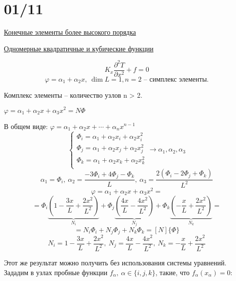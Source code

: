 \section*{01/11}
\begin{center}
\underline{Конечные элементы более высокого порядка}

\underline{Одномерные квадратичные и кубические функции}
\end{center}
\[
K_x \frac{\partial^2 T}{\partial x^2} + f = 0
\]
\[
\varphi = \alpha_1 + \alpha_2x, \ \dim L = 1, n = 2 \text{ -- симплекс элементы.}
\]

Комплекс элементы -- количество узлов n > 2.  

\begin{center}
\end{center}

$\varphi = \alpha_1 + \alpha_2x + \alpha_3x^2 = N \Phi$

В общем виде: $\varphi = \alpha_1 + \alpha_2x + \cdots + \alpha_nx^{n-1}$
\[
\begin{cases}
\Phi_i = \alpha_1 + \alpha_2x_i + \alpha_2x^{2}_i \\
\Phi_j = \alpha_1 + \alpha_2x_j + \alpha_2x^{2}_j \\
\Phi_k = \alpha_1 + \alpha_2x_k + \alpha_2x^{2}_k \\
\end{cases}
\rightarrow \alpha_1, \alpha_2, \alpha_3
\]
\[
\alpha_1 = \Phi_i, \ \alpha_2 = \frac{-3\Phi_i + 4\Phi_j -\Phi_k}{L}, \ \alpha_3 = \frac{2(\Phi_i-2\Phi_j+\Phi_k)}{L^2}
\]
\[
\varphi = \alpha_1 + \alpha_2x + \alpha_3x^2 = 
\]
\[
 = \Phi_i   \underbrace{\left(1 - \frac{3x}{L} + \frac{2x^2}{L^2} \right) }_{N_i}   + \Phi_j \underbrace{\left(\frac{4x}{L} - \frac{4x^2}{L^2} \right)}_{N_j} + \Phi_k \underbrace{\left(-\frac{x}{L} + \frac{2x^2}{L^2} \right)}_{N_k} = 
\]
\[
 = N_i \Phi_i + N_j \Phi_j + N_k \Phi_k = [N]\{\Phi\}
\]
\[
N_i = 1 - \frac{3x}{L} + \frac{2x^2}{L^2}, \ N_j = \frac{4x}{L} - \frac{4x^2}{L^2}, \ N_k = -\frac{x}{L} + \frac{2x^2}{L^2}
\]

Этот же результат можно получить без использования системы уравнений. Зададим в узлах пробные функции $f_{\alpha},\ \alpha \in \{i, j, k\}$, такие, что $f_{\alpha}(x_{\alpha}) = 0$:

